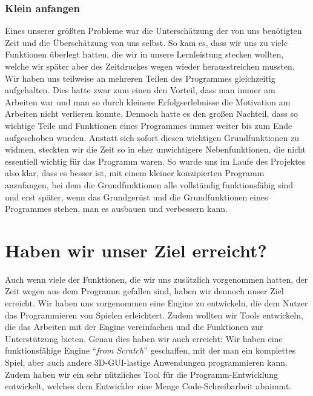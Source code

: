 \subsubsection{Klein anfangen}
\label{kleinanfangen}
Eines unserer größten Probleme war die Unterschätzung der von uns benötigten Zeit und die Überschätzung von uns selbst. So kam es, dass wir uns zu viele Funktionen überlegt hatten, die wir in unsere Lernleistung stecken wollten, welche wir später aber des Zeitdruckes wegen wieder herausstreichen mussten. 
Wir haben uns teilweise an mehreren Teilen des Programmes gleichzeitig aufgehalten. Dies hatte zwar zum einen den Vorteil, dass man immer am Arbeiten war und man so durch kleinere Erfolgserlebnisse die Motivation am Arbeiten nicht verlieren konnte. Dennoch hatte es den großen Nachteil, dass so wichtige Teile und Funktionen eines Programmes immer weiter bis zum Ende aufgeschoben wurden. Anstatt sich sofort diesen wichtigen Grundfunktionen zu widmen, steckten wir die Zeit so in eher unwichtigere Nebenfunktionen, die nicht essentiell wichtig für das Programm waren.
So wurde uns im Laufe des Projektes  also klar, dass es besser ist, mit einem kleiner konzipierten Programm anzufangen, bei dem die Grundfunktionen alle vollständig funktionsfähig sind und erst später, wenn das Grundgerüst und die Grundfunktionen eines Programmes stehen, man es ausbauen und verbessern kann. 

\section{Haben wir unser Ziel erreicht?}
Auch wenn viele der Funktionen, die wir uns zusätzlich vorgenommen hatten, der Zeit wegen aus dem Programm gefallen sind, haben wir dennoch unser Ziel erreicht. Wir haben uns vorgenommen eine Engine zu entwickeln, die dem Nutzer das Programmieren von Spielen erleichtert. Zudem wollten wir Tools entwickeln, die das Arbeiten mit der Engine vereinfachen und die Funktionen zur Unterstützung bieten.
Genau dies haben wir auch erreicht:
Wir haben eine funktionsfähige Engine "`\textit{from Scratch}"' geschaffen, mit der man ein komplettes Spiel, aber auch andere 3D-GUI-lastige Anwendungen programmieren kann. Zudem haben wir ein sehr nützliches Tool für die Programm-Entwicklung entwickelt, welches dem Entwickler eine Menge Code-Schreibarbeit abnimmt. 

